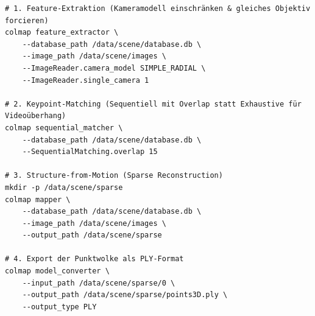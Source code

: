 \documentclass[12pt,a4paper]{article}
\begin{document}
\begin{verbatim}
# 1. Feature-Extraktion (Kameramodell einschränken & gleiches Objektiv forcieren)
colmap feature_extractor \
    --database_path /data/scene/database.db \
    --image_path /data/scene/images \
    --ImageReader.camera_model SIMPLE_RADIAL \
    --ImageReader.single_camera 1

# 2. Keypoint-Matching (Sequentiell mit Overlap statt Exhaustive für Videoüberhang)
colmap sequential_matcher \
    --database_path /data/scene/database.db \
    --SequentialMatching.overlap 15

# 3. Structure-from-Motion (Sparse Reconstruction)
mkdir -p /data/scene/sparse
colmap mapper \
    --database_path /data/scene/database.db \
    --image_path /data/scene/images \
    --output_path /data/scene/sparse

# 4. Export der Punktwolke als PLY-Format
colmap model_converter \
    --input_path /data/scene/sparse/0 \
    --output_path /data/scene/sparse/points3D.ply \
    --output_type PLY
\end{verbatim}
\end{document}
